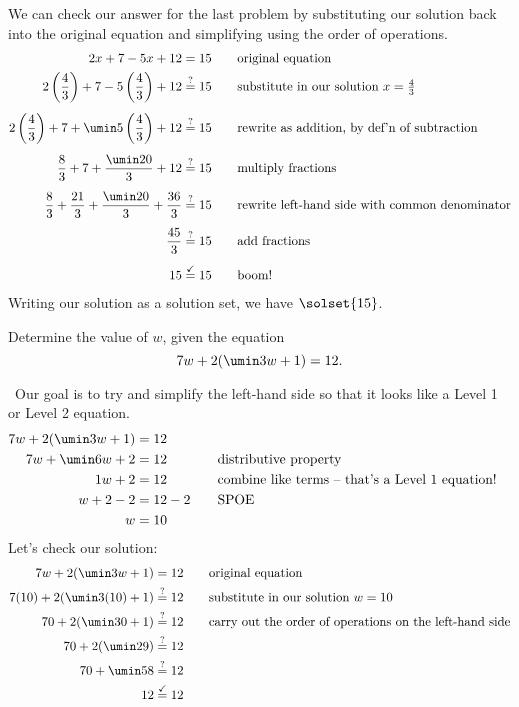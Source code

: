 We can check our answer for the last problem by substituting our solution back into the original equation and simplifying using the order of operations.
\[\begin{aligned}
2x + 7 - 5x + 12 & = 15
&& \text{\quad original equation}\\
2\left(\frac{4}{3}\right) + 7 - 5\left(\frac{4}{3}\right) + 12 & \overset{?}{=} 15
&& \text{\quad substitute in our solution $x = \tfrac{4}{3}$}\\[1ex]
2\left(\frac{4}{3}\right) + 7 + \umin5\left(\frac{4}{3}\right) + 12 & \overset{?}{=} 15
&& \text{\quad rewrite as addition, by def'n of subtraction}\\[1ex]
\frac{8}{3} + 7 + \frac{\umin20}{3} + 12 & \overset{?}{=} 15
&& \text{\quad multiply fractions}\\[1ex]
\frac{8}{3} + \frac{21}{3} + \frac{\umin20}{3} + \frac{36}{3} & \overset{?}{=} 15
&& \text{\quad rewrite left-hand side with common denominator}\\[1ex]
\frac{45}{3} & \overset{?}{=} 15
&& \text{\quad add fractions}\\[1ex]
15 & \overset{\checkmark}{=} 15
&& \text{\quad boom!}
\end{aligned}\]
Writing our solution as a solution set, we have $\solset{15}$.

\begin{boxex}
\label{ex:dist}
Determine the value of $w$, given the equation \[7w + 2(\umin3w + 1) = 12.\]

\exsoln\ Our goal is to try and simplify the left-hand side so that it looks like a Level 1 or Level 2 equation.
\[\begin{aligned}
7w + 2(\umin3w + 1) &= 12\\
7w + \umin6w + 2 &= 12
&&\text{\quad distributive property}\\
1w + 2 & = 12
&&\text{\quad combine like terms -- that's a Level 1 equation!}\\
w + 2 - 2 & = 12 - 2
&&\text{\quad SPOE}\\
w & = 10
\end{aligned}\]
Let's check our solution:
\[\begin{aligned}
7w + 2(\umin3w + 1) &= 12
&& \text{\quad original equation}\\
7(10) + 2(\umin3(10) + 1) &\overset{?}{=} 12
&& \text{\quad substitute in our solution $w = 10$}\\
70 + 2(\umin30 + 1) &\overset{?}{=} 12
&& \text{\quad carry out the order of operations on the left-hand side}\\
70 + 2(\umin29) &\overset{?}{=} 12\\
70 + \umin58 &\overset{?}{=} 12\\
12 &\overset{\checkmark}{=} 12\\
\end{aligned}\]
\end{boxex}

